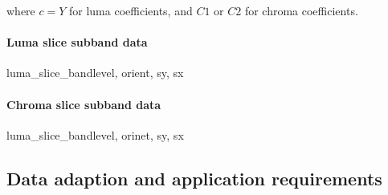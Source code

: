 where $c=Y$ for luma coefficients, and $C1$ or $C2$ for chroma coefficients.

\paragraph{Luma slice subband data\\}
\label{lumasliceband}

\begin{pseudo}{luma\_slice\_band}{level, orient, sy, sx}
  \bsEND
\bsEND
\end{pseudo}

\paragraph{Chroma slice subband data\\}
\label{chromasliceband}

\begin{pseudo}{luma\_slice\_band}{level, orinet, sy, sx}
  \bsEND
\bsEND
\end{pseudo}

\begin{informative*}
\subsection{Data adaption and application requirements}
\label{apps}

\end{informative*}